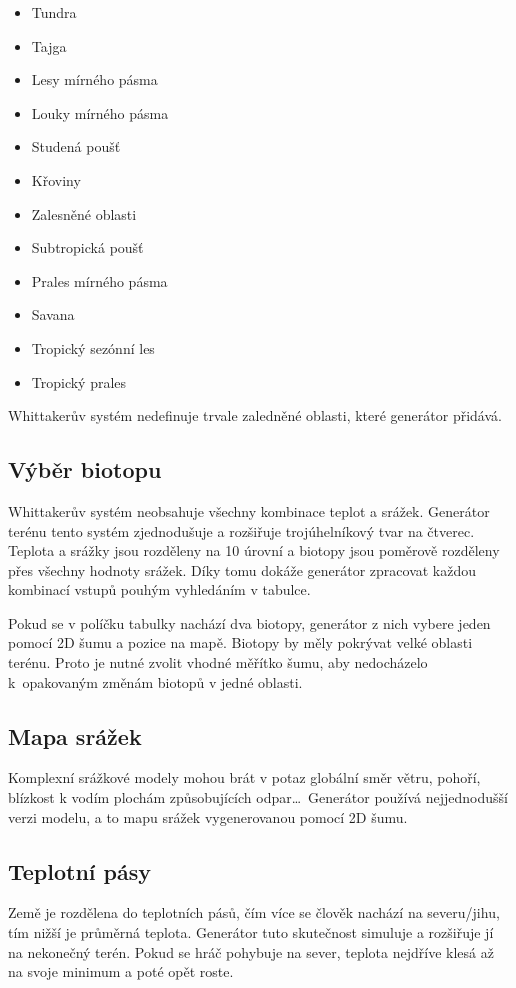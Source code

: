 \documentclass[thesis=M,czech]{FITthesis}[2019/12/23]
\begin{document}
\begin{itemize}
\item Tundra
\item Tajga
\item Lesy mírného pásma
\item Louky mírného pásma
\item Studená poušť
\item Křoviny
\item Zalesněné oblasti
\item Subtropická poušť
\item Prales mírného pásma
\item Savana
\item Tropický sezónní les
\item Tropický prales
\end{itemize}

Whittakerův systém nedefinuje trvale zaledněné oblasti, které generátor přidává.

\subsection{Výběr biotopu}
Whittakerův systém neobsahuje všechny kombinace teplot a srážek. Generátor terénu tento systém zjednodušuje a rozšiřuje trojúhelníkový tvar na čtverec. Teplota a srážky jsou rozděleny na 10 úrovní a biotopy jsou poměrově rozděleny přes všechny hodnoty srážek. Díky tomu dokáže generátor zpracovat každou kombinací vstupů pouhým vyhledáním v tabulce.

Pokud se v políčku tabulky nachází dva biotopy, generátor z nich vybere jeden pomocí 2D šumu a pozice na mapě. Biotopy by měly pokrývat velké oblasti terénu. Proto je nutné zvolit vhodné měřítko šumu, aby nedocházelo k~opakovaným změnám biotopů v jedné oblasti.

\subsection{Mapa srážek}

Komplexní srážkové modely mohou brát v potaz globální směr větru, pohoří, blízkost k vodím plochám způsobujících odpar\dots ~Generátor používá nejjednodušší verzi modelu, a to mapu srážek vygenerovanou pomocí 2D šumu.

\subsection{Teplotní pásy}

Země je rozdělena do teplotních pásů, čím více se člověk nachází na severu/jihu, tím nižší je průměrná teplota. Generátor tuto skutečnost simuluje a rozšiřuje jí na nekonečný terén. Pokud se hráč pohybuje na sever, teplota nejdříve klesá až na svoje minimum a poté opět roste.
\end{document}
